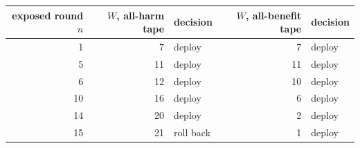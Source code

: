 \begin{tabular}{@{}rrlrl@{}}
\toprule
exposed round $n$ & $W$, all-harm tape & decision & $W$, all-benefit tape & decision \\
\midrule
1 & 7 & deploy & 7 & deploy \\
5 & 11 & deploy & 11 & deploy \\
6 & 12 & deploy & 10 & deploy \\
10 & 16 & deploy & 6 & deploy \\
14 & 20 & deploy & 2 & deploy \\
15 & 21 & roll back & 1 & deploy \\
\bottomrule
\end{tabular}
